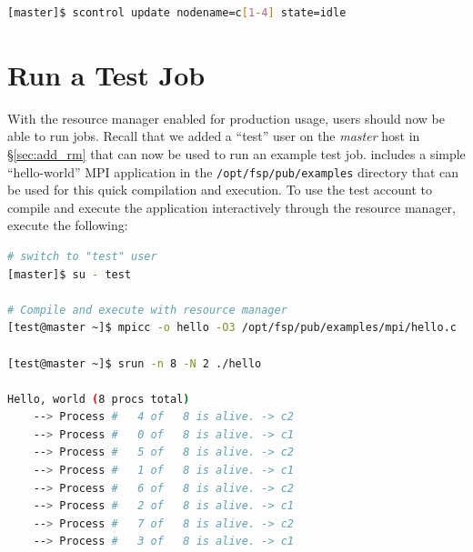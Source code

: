 \documentclass[letterpaper]{article}
\begin{document}

\begin{lstlisting}[language=bash]
[master]$ scontrol update nodename=c[1-4] state=idle
\end{lstlisting}


\section{Run a Test Job}

With the resource manager enabled for production usage, users should now be
able to run jobs.  Recall that we added a ``test'' user on the {\em master}
host in \S\ref{sec:add_rm} that can now be used to run an example test job.
\FSP{} includes a simple ``hello-world'' MPI application in the
\texttt{/opt/fsp/pub/examples} directory that can be used for this quick
compilation and execution.  To use the test account to compile and execute the
application interactively through the resource manager, execute the following:

\begin{lstlisting}[language=bash,keywords={}]
# switch to "test" user
[master]$ su - test

# Compile and execute with resource manager
[test@master ~]$ mpicc -o hello -O3 /opt/fsp/pub/examples/mpi/hello.c

[test@master ~]$ srun -n 8 -N 2 ./hello

Hello, world (8 procs total)
    --> Process #   4 of   8 is alive. -> c2
    --> Process #   0 of   8 is alive. -> c1
    --> Process #   5 of   8 is alive. -> c2
    --> Process #   1 of   8 is alive. -> c1
    --> Process #   6 of   8 is alive. -> c2
    --> Process #   2 of   8 is alive. -> c1
    --> Process #   7 of   8 is alive. -> c2
    --> Process #   3 of   8 is alive. -> c1
\end{lstlisting}



\end{document}
